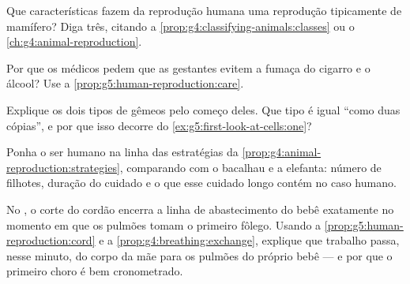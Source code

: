 \begin{exercise}[$\star$]\label{exo:g5:human-reproduction:7}
Que características fazem da reprodução humana uma reprodução
tipicamente de mamífero? Diga três, citando a
\cref{prop:g4:classifying-animals:classes} ou o
\cref{ch:g4:animal-reproduction}.
\end{exercise}

\begin{exercise}[$\star$]\label{exo:g5:human-reproduction:8}
Por que os médicos pedem que as gestantes evitem a fumaça do cigarro
e o álcool? Use a \cref{prop:g5:human-reproduction:care}.
\end{exercise}

\begin{exercise}[$\star\star$]\label{exo:g5:human-reproduction:9}
Explique os dois tipos de gêmeos pelo começo deles. Que tipo é igual
``como duas cópias'', e por que isso decorre do
\cref{ex:g5:first-look-at-cells:one}?
\end{exercise}

\begin{exercise}[$\star\star$]\label{exo:g5:human-reproduction:10}
Ponha o ser humano na linha das estratégias da
\cref{prop:g4:animal-reproduction:strategies}, comparando com o
bacalhau e a elefanta: número de filhotes, duração do cuidado e o
que esse cuidado longo contém no caso humano.
\end{exercise}

\begin{exercise}[$\star\star\star$]\label{exo:g5:human-reproduction:11}
No , o corte do cordão encerra a linha de abastecimento do
bebê exatamente no momento em que os pulmões tomam o primeiro
fôlego. Usando a \cref{prop:g5:human-reproduction:cord} e a
\cref{prop:g4:breathing:exchange}, explique que trabalho passa,
nesse minuto, do corpo da mãe para os pulmões do próprio bebê --- e
por que o primeiro choro é bem cronometrado.
\end{exercise}
